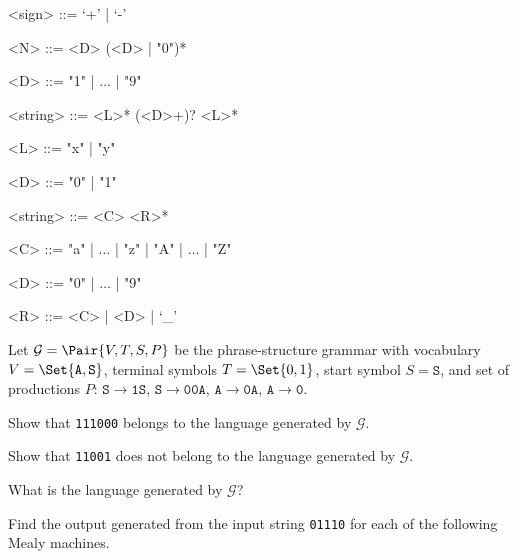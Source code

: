 \documentclass[a4paper,12pt]{article}
\begin{document}
\begin{tasks}
\begin{multicols}{2}
\begin{subtasks}
\begin{grammar}
            <sign> ::= `+' | `-'

            <N> ::= <D> (<D> | "0")*

            <D> ::= "1" | $\ldots$ | "9"
        \end{grammar}

        \item \begin{grammar}
            <string> ::= <L>* (<D>+)? <L>*

            <L> ::= "x" | "y"

            <D> ::= "0" | "1"
        \end{grammar}

        \item \begin{grammar}
            <string> ::= <C> <R>*

            <C> ::= "a" | $\ldots$ | "z" | "A" | $\ldots$ | "Z"

            <D> ::= "0" | $\ldots$ | "9"

            <R> ::= <C> | <D> | `_'
        \end{grammar}
    \end{subtasks}
    \end{multicols}


    \item Let $\mathcal{G} = \Pair{V, T, S, P}$ be the phrase-structure grammar with vocabulary $V = \Set{\mathtt{A}, \mathtt{S}}$, terminal symbols $T = \Set{0, 1}$, start symbol $S = \mathtt{S}$, and set of productions $P$: $\mathtt{S} \to \mathtt{1S}$, $\mathtt{S} \to \mathtt{00A}$, $\mathtt{A} \to \mathtt{0A}$, $\mathtt{A} \to \mathtt{0}$.

    \begin{subtasks}
        \item Show that \texttt{111000} belongs to the language generated by $\mathcal{G}$.
        \item Show that \texttt{11001} does not belong to the language generated by $\mathcal{G}$.
        \item What is the language generated by $\mathcal{G}$?
    \end{subtasks}


    \item Find the output generated from the input string \texttt{01110} for each of the following Mealy machines.


\end{tasks}
\end{document}
